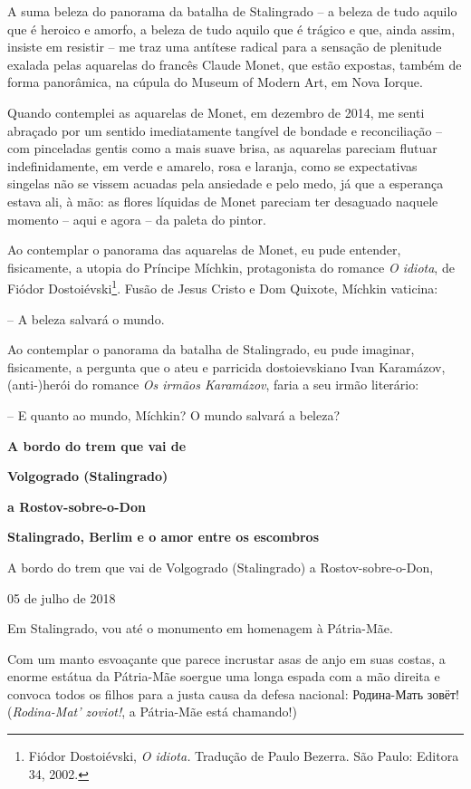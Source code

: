 A suma beleza do panorama da batalha de Stalingrado -- a beleza de tudo
aquilo que é heroico e amorfo, a beleza de tudo aquilo que é trágico e
que, ainda assim, insiste em resistir -- me traz uma antítese radical
para a sensação de plenitude exalada pelas aquarelas do francês Claude
Monet, que estão expostas, também de forma panorâmica, na cúpula do
Museum of Modern Art, em Nova Iorque.

Quando contemplei as aquarelas de Monet, em dezembro de 2014, me senti
abraçado por um sentido imediatamente tangível de bondade e
reconciliação -- com pinceladas gentis como a mais suave brisa, as
aquarelas pareciam flutuar indefinidamente, em verde e amarelo, rosa e
laranja, como se expectativas singelas não se vissem acuadas pela
ansiedade e pelo medo, já que a esperança estava ali, à mão: as flores
líquidas de Monet pareciam ter desaguado naquele momento -- aqui e agora
-- da paleta do pintor.

Ao contemplar o panorama das aquarelas de Monet, eu pude entender,
fisicamente, a utopia do Príncipe Míchkin, protagonista do romance
\emph{O idiota}, de Fiódor Dostoiévski\footnote{Fiódor Dostoiévski,
  \emph{O idiota.} Tradução de Paulo Bezerra. São Paulo: Editora 34,
  2002.}. Fusão de Jesus Cristo e Dom Quixote, Míchkin vaticina:

-- A beleza salvará o mundo.

Ao contemplar o panorama da batalha de Stalingrado, eu pude imaginar,
fisicamente, a pergunta que o ateu e parricida dostoievskiano Ivan
Karamázov, (anti-)herói do romance \emph{Os irmãos Karamázov}, faria a
seu irmão literário:

-- E quanto ao mundo, Míchkin? O mundo salvará a beleza?

\textbf{A bordo do trem que vai de }

\textbf{Volgogrado (Stalingrado) }

\textbf{a Rostov-sobre-o-Don}

\textbf{Stalingrado, Berlim e o amor entre os escombros}

A bordo do trem que vai de Volgogrado (Stalingrado) a
Rostov-sobre-o-Don,

05 de julho de 2018

Em Stalingrado, vou até o monumento em homenagem à Pátria-Mãe.

Com um manto esvoaçante que parece incrustar asas de anjo em suas
costas, a enorme estátua da Pátria-Mãe soergue uma longa espada com a
mão direita e convoca todos os filhos para a justa causa da defesa
nacional: Родина-Мать зовёт! (\emph{Rodina-Mat' zoviot!}, a Pátria-Mãe
está chamando!)

